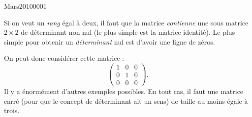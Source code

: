 

\begin{corrige}{Mars20100001}

	Si on veut un \emph{rang} égal à deux, il faut que la matrice \emph{contienne} une sous matrice $2\times 2$ de déterminant non nul (le plus simple est la matrice identité). Le plus simple pour obtenir un \emph{déterminant} nul est d'avoir une ligne de zéros.

	On peut donc considérer cette matrice :
	\begin{equation}
		\begin{pmatrix}
			1	&	0	&	0	\\
			0	&	1	&	0	\\
			0	&	0	&	0
		\end{pmatrix}.
	\end{equation}
	Il y a énormément d'autres exemples possibles. En tout cas, il faut une matrice carré (pour que le concept de déterminant ait un sens) de taille au moins égale à trois.

\end{corrige}
